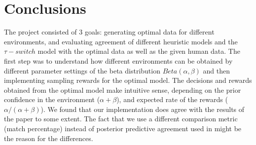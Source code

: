 \section{Conclusions}
\label{conclusions}
The project consisted of 3 goals: generating optimal data for different environments, and evaluating agreement of different heuristic models and the $\tau-switch$ model with the optimal data as well as the given human data. The first step was to understand how different environments can be obtained by different parameter settings of the beta distribution $Beta(\alpha, \beta)$ and then implementing sampling rewards for the optimal model. The decisions and rewards obtained from the optimal model make intuitive sense, depending on the prior confidence in the environment ($\alpha + \beta$), and expected rate of the rewards ($\alpha/ (\alpha + \beta)$). We found that our implementation does agree with the results of the paper \cite{shunan2011} to some extent. The fact that we use a different comparison metric (match percentage) instead of posterior predictive agreement used in \cite{shunan2011} might be the reason for the differences. 

